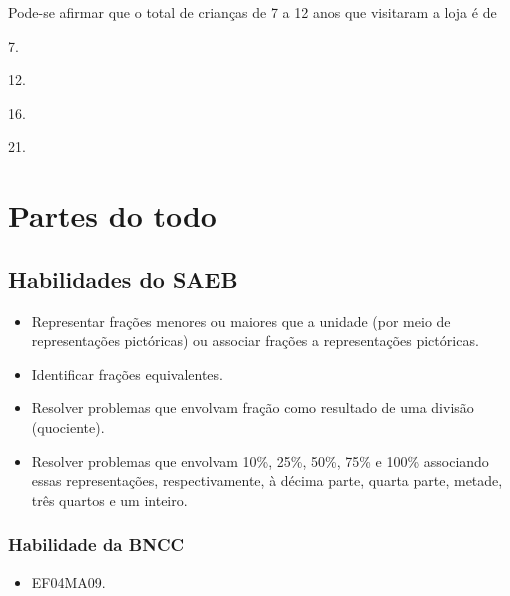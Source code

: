 Pode-se afirmar que o total de crianças
de 7 a 12 anos que visitaram a loja é de

\begin{escolha}
\item
  7.
\item
  12.
\item
  16.
\item
  21.
\end{escolha}


\chapter{Partes do todo}

\section*{Habilidades do SAEB}

\begin{itemize}
\item Representar frações menores ou maiores que a unidade (por meio de
representações pictóricas) ou associar frações a representações pictóricas.

\item Identificar frações equivalentes.

\item Resolver problemas que envolvam fração como resultado de uma divisão
(quociente).

\item Resolver problemas que envolvam 10\%, 25\%, 50\%, 75\% e 100\%
associando essas representações, respectivamente, à décima parte, quarta parte, metade,
três quartos e um inteiro.
\end{itemize}

\subsection{Habilidade da BNCC}

\begin{itemize}
\item EF04MA09.
\end{itemize}

